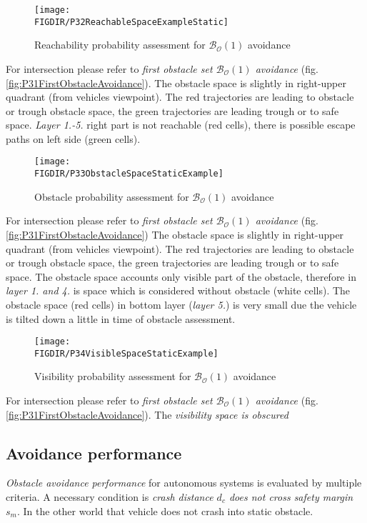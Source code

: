 \begin{figure}[H]
    \centering
    \texttt{[image: \\FIGDIR/P32ReachableSpaceExampleStatic]}
    \caption{Reachability probability assessment for $\mathscr{B}_\mathscr{O}(1)$ avoidance}
    \label{fig:P32ReachableSpaceExampleStatic}
\end{figure}
\noindent For intersection please refer to \emph{first obstacle set $\mathscr{B}_\mathscr{O}(1)$ avoidance} (fig. \ref{fig:P31FirstObstacleAvoidance}). The obstacle space is slightly in right-upper quadrant (from vehicles viewpoint). The red trajectories are leading to obstacle or trough obstacle space, the green trajectories are leading trough or to safe space. \emph{Layer 1.-5.} right part is not reachable (red cells), there is possible escape paths on left side (green cells).

\begin{figure}[H]
    \centering
    \texttt{[image: \\FIGDIR/P33ObstacleSpaceStaticExample]}
    \caption{Obstacle probability assessment for $\mathscr{B}_\mathscr{O}(1)$ avoidance}
    \label{fig:P33ObstacleSpaceStaticExample}
\end{figure}
\noindent For intersection please refer to \emph{first obstacle set $\mathscr{B}_\mathscr{O}(1)$ avoidance} (fig. \ref{fig:P31FirstObstacleAvoidance})
The obstacle space is slightly in right-upper quadrant (from vehicles viewpoint). The red trajectories are leading to obstacle or trough obstacle space, the green trajectories are leading trough or to safe space. The obstacle space accounts only visible part of the obstacle, therefore in \emph{layer 1. and 4.} is space which is considered without obstacle (white cells). The obstacle space (red cells) in bottom layer (\emph{layer 5.}) is very small due the vehicle is tilted down a little in time of obstacle assessment.

\begin{figure}[H]
    \centering
    \texttt{[image: \\FIGDIR/P34VisibleSpaceStaticExample]}
    \caption{Visibility probability assessment for $\mathscr{B}_\mathscr{O}(1)$ avoidance}
    \label{fig:P34VisibleSpaceStaticExample}
\end{figure}
\noindent For intersection please refer to \emph{first obstacle set $\mathscr{B}_\mathscr{O}(1)$ avoidance} (fig. \ref{fig:P31FirstObstacleAvoidance}). 
The \emph{visibility space is obscured }


\subsection{Avoidance performance}\label{sec:avoidancePerformacne}
\noindent \emph{Obstacle avoidance performance} for autonomous systems is evaluated by multiple criteria. A necessary condition is \emph{crash distance $d_c$ does not cross safety margin $s_m$}. In the other world that vehicle does not crash into static obstacle. 

